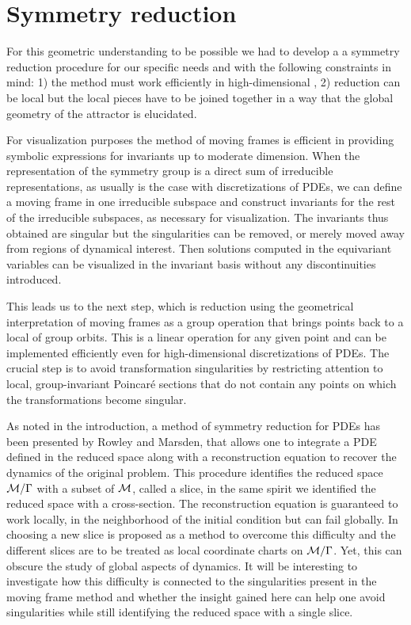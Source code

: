 \section{Symmetry reduction}

For this geometric understanding to be possible we had to develop a
a symmetry reduction procedure for our specific needs
and with the following
constraints in mind:
1) the method must work efficiently in high-dimensional \statesp, 2) reduction
can be local but the local pieces have to be joined together in
a way that the global geometry of the attractor is elucidated.

For visualization purposes the method of moving frames is efficient in providing
symbolic expressions for invariants up to moderate dimension. When the
representation of the symmetry group is a direct sum of irreducible representations,
as usually is the case with discretizations of PDEs, we can define a moving
frame in one irreducible subspace and construct invariants for the rest of
the irreducible subspaces, as necessary for visualization.
The invariants thus obtained are singular but the singularities can be removed,
or merely moved away from regions of dynamical interest.
Then solutions computed in the equivariant variables can be visualized
in the invariant basis without any discontinuities introduced.

This leads us to the next step, which is reduction using the
geometrical interpretation of moving frames as a group
operation that brings points back to a local {\slice} of
group orbits. This is a linear operation for any given point
and can be implemented efficiently even for high-dimensional
discretizations of PDEs. The crucial step is to avoid
transformation singularities by restricting attention to
local, group-invariant Poincar\'e sections that do not
contain any points on which the transformations become
singular.

As noted in the introduction, a method of symmetry reduction
for PDEs has been presented by Rowley and
Marsden, that allows one to
integrate a PDE defined in the reduced space along with a
reconstruction equation to recover the dynamics of the
original problem. This procedure identifies the reduced space
$\mathcal{M}/\Gamma$ with a subset of $\mathcal{M}$, called a slice, in
the same spirit we identified the reduced space with a
cross-section.
The reconstruction equation is guaranteed to
work locally, in the neighborhood of the initial condition
but can fail globally. In 
choosing a new slice is proposed as a method to overcome this
difficulty and the different slices are to be treated as
local coordinate charts on $\mathcal{M}/\Gamma$. Yet, this can
obscure the study of global aspects of dynamics. It will be
interesting to investigate how this difficulty is connected
to the singularities present in the moving frame method and
whether the insight gained here can help one avoid
singularities while still identifying the reduced space with
a single slice.


